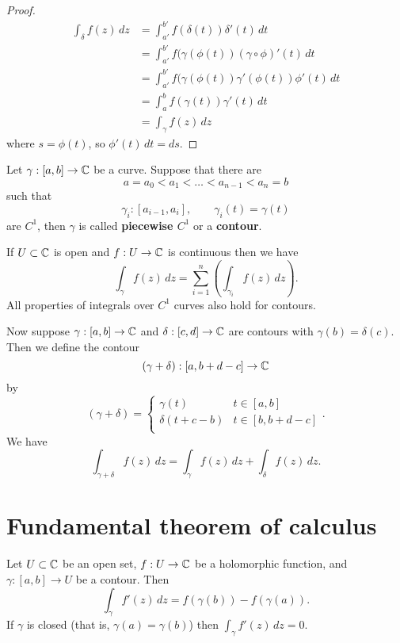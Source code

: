 
\begin{proof}
    \begin{align*}
        \int_\delta f(z) \,dz
        &= \int_{a'}^{b'} f(\delta(t)) \delta'(t) \,dt \\
        &= \int_{a'}^{b'} f(\gamma(\phi(t))(\gamma \circ \phi)'(t) \,dt \\
        &= \int_{a'}^{b'} f(\gamma(\phi(t)) \gamma'(\phi(t)) \phi'(t) \,dt \\
        &= \int_a^b f(\gamma(t)) \gamma'(t) \,dt \\
        &= \int_\gamma f(z) \,dz
    \end{align*}
    where $s = \phi(t)$, so $\phi'(t)\,dt = ds$.
\end{proof}

\begin{definition}[Contour]
    Let $\gamma : [a, b] \to \mathbb{C}$ be a curve.
    Suppose that there are
    \[ a = a_0 < a_1 < \ldots < a_{n-1} < a_n = b \]
    such that
    \[ \gamma_i:[a_{i - 1}, a_i], \qquad \gamma_i(t) = \gamma(t) \]
    are $C^1$, then $\gamma$ is called \textbf{piecewise $C^1$} or a
    \textbf{contour}.
\end{definition}

If $U \subset \mathbb{C}$ is open and $f: U \to \mathbb{C}$ is continuous then we have
\[ \int_\gamma f(z) \, dz = \sum_{i = 1}^n \left(\int_{\gamma_i} f(z) \,dz\right). \]
All properties of integrals over $C^1$ curves also hold for contours.

Now suppose $\gamma: [a, b] \to \mathbb{C}$ and $\delta:[c, d] \to \mathbb{C}$ are contours
with $\gamma(b) = \delta(c)$. Then we define the contour
\[ (\gamma + \delta): [a, b + d - c] \to \mathbb{C} \]
by
\[
    (\gamma + \delta) =
    \begin{cases}
        \gamma(t) & t \in [a,b] \\
        \delta(t + c - b) & t \in [b, b + d - c] \\
    \end{cases}
    .
\]
We have
\[ 
    \int_{\gamma + \delta} f(z) \,dz =
    \int_\gamma f(z) \,dz + \int_\delta f(z) \,dz.
\]

\section{Fundamental theorem of calculus}

\begin{theorem}
    Let $U \subset \mathbb{C}$ be an open set,
    $f: U \to \mathbb{C}$ be a holomorphic function, and
    $\gamma: [a, b] \to U$ be a contour.
    Then
    \[ \int_\gamma f'(z) \,dz = f(\gamma(b)) - f(\gamma(a)). \]
    If $\gamma$ is closed (that is, $\gamma(a) = \gamma(b)$)
    then $\int_\gamma f'(z) \,dz = 0$.
\end{theorem}

